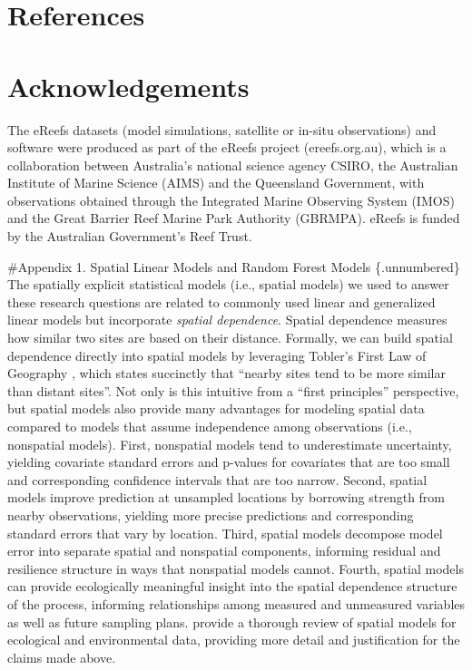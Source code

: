 \documentclass[
  letterpaper,
  DIV=11,
  numbers=noendperiod]{scrartcl}
\begin{document}
\clearpage

\section*{References}\label{references}

\renewcommand{\bibsection}{}


\section{Acknowledgements}\label{acknowledgements}

The eReefs datasets (model simulations, satellite or in-situ
observations) and software were produced as part of the eReefs project
(ereefs.org.au), which is a collaboration between Australia's national
science agency CSIRO, the Australian Institute of Marine Science (AIMS)
and the Queensland Government, with observations obtained through the
Integrated Marine Observing System (IMOS) and the Great Barrier Reef
Marine Park Authority (GBRMPA). eReefs is funded by the Australian
Government's Reef Trust.

\#Appendix 1. Spatial Linear Models and Random Forest Models
\{.unnumbered\} The spatially explicit statistical models (i.e., spatial
models) we used to answer these research questions are related to
commonly used linear and generalized linear models but incorporate
\emph{spatial dependence}. Spatial dependence measures how similar two
sites are based on their distance. Formally, we can build spatial
dependence directly into spatial models by leveraging Tobler's First Law
of Geography \citep{tobler1970computer}, which states succinctly that
``nearby sites tend to be more similar than distant sites''. Not only is
this intuitive from a ``first principles'' perspective, but spatial
models also provide many advantages for modeling spatial data compared
to models that assume independence among observations (i.e., nonspatial
models). First, nonspatial models tend to underestimate uncertainty,
yielding covariate standard errors and p-values for covariates that are
too small and corresponding confidence intervals that are too narrow.
Second, spatial models improve prediction at unsampled locations by
borrowing strength from nearby observations, yielding more precise
predictions and corresponding standard errors that vary by location.
Third, spatial models decompose model error into separate spatial and
nonspatial components, informing residual and resilience structure in
ways that nonspatial models cannot. Fourth, spatial models can provide
ecologically meaningful insight into the spatial dependence structure of
the process, informing relationships among measured and unmeasured
variables as well as future sampling plans. \citet{zimmerman2024spatial}
provide a thorough review of spatial models for ecological and
environmental data, providing more detail and justification for the
claims made above.
\end{document}

